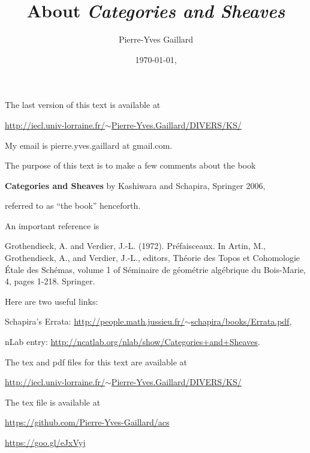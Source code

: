 \documentclass[12pt]{article}
\title{About \em{Categories and Sheaves}}
\author{Pierre-Yves Gaillard}%
\date{\today, \currenttime}
\theoremstyle{remark}
\theoremstyle{definition}
\begin{document}
\maketitle

\nn The last version of this text is available at\medskip

\centerline{\href{http://iecl.univ-lorraine.fr/~Pierre-Yves.Gaillard/DIVERS/KS/}{http://iecl.univ-lorraine.fr/$\sim$Pierre-Yves.Gaillard/DIVERS/KS/}}

My email is pierre.yves.gaillard at gmail.com.

\tableofcontents\newpage

\nn The purpose of this text is to make a few comments about the book 

\textbf{Categories and Sheaves} by Kashiwara and Schapira, Springer 2006, 

\nn referred to as ``the book'' henceforth. 

An important reference is

\nn[GV] Grothendieck, A. and Verdier, J.-L. (1972). Préfaisceaux. In Artin, M., Grothendieck, A., and Verdier, J.-L., editors, Théorie des Topos et Cohomologie Étale des Schémas, volume 1 of Séminaire de géométrie algébrique du Bois-Marie, 4, pages 1-218. Springer. 


Here are two useful links:

\nn Schapira's Errata: \href{http://people.math.jussieu.fr/~schapira/books/Errata.pdf}{http://people.math.jussieu.fr/$\sim$schapira/books/Errata.pdf},

\nn nLab entry: \href{http://ncatlab.org/nlab/show/Categories+and+Sheaves}{http://ncatlab.org/nlab/show/Categories+and+Sheaves}. 

The tex and pdf files for this text are available at
 
\nn\href{http://iecl.univ-lorraine.fr/~Pierre-Yves.Gaillard/DIVERS/KS/}{http://iecl.univ-lorraine.fr/$\sim$Pierre-Yves.Gaillard/DIVERS/KS/}

The tex file is available at

\nn\href{https://github.com/Pierre-Yves-Gaillard/acs}{https://github.com/Pierre-Yves-Gaillard/acs}

\nn\href{https://goo.gl/eJxVyj}{https://goo.gl/eJxVyj}

\end{document}
